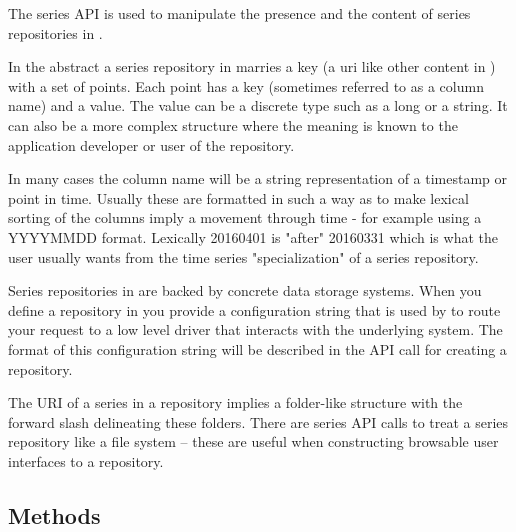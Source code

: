 
The series API is used to manipulate the presence and the content of series repositories
in \Rapture.

In the abstract a series repository in \Rapture marries a key (a uri like other content in \Rapture) with
a set of points. Each point has a key (sometimes referred to as a column name) and a value. The value
can be a discrete type such as a long or a string. It can also be a more complex structure where the meaning
is known to the application developer or user of the repository.

In many cases the column name will be a string representation of a timestamp or point in time. Usually these
are formatted in such a way as to make lexical sorting of the columns imply a movement through time - for example
using a YYYYMMDD format. Lexically 20160401 is "after" 20160331 which is what the user usually wants from the
time series "specialization" of a \Rapture series repository.

Series repositories in \Rapture are backed by concrete data storage systems. When
you define a repository in \Rapture you provide a configuration string that is used
by \Rapture to route your request to a low level driver that interacts with the
underlying system. The format of this configuration string will be described in
the API call for creating a repository.

The URI of a series in a repository implies a folder-like structure with the
forward slash delineating these folders. There are series API calls to treat a
series repository like a file system -- these are useful when constructing
browsable user interfaces to a repository.

\subsection{Methods}
